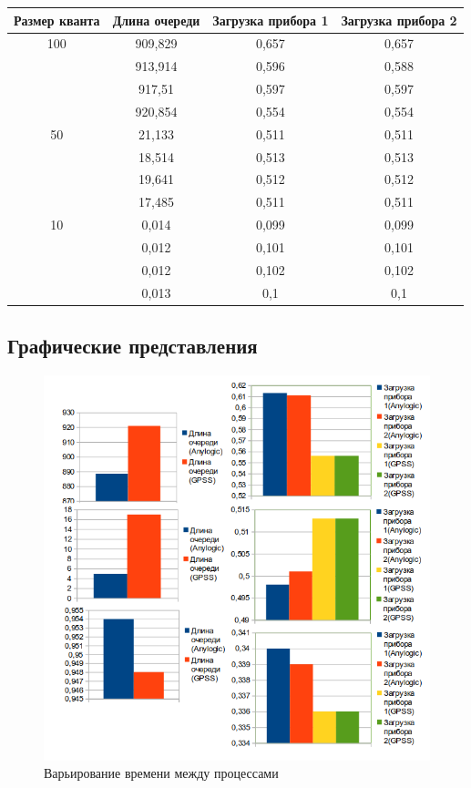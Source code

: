 \begin{tabular}{|c|c|c|c|}
\hline
Размер кванта & Длина очереди & Загрузка прибора 1 & Загрузка прибора 2 \\ \hline
100 & 909,829 & 0,657 & 0,657 \\ \hline
 & 913,914 & 0,596 & 0,588 \\ \hline
 & 917,51 & 0,597 & 0,597 \\ \hline
 & 920,854 & 0,554 & 0,554 \\ \hline
50 & 21,133 & 0,511 & 0,511 \\ \hline
 & 18,514 & 0,513 & 0,513 \\ \hline
 & 19,641 & 0,512 & 0,512 \\ \hline
 & 17,485 & 0,511 & 0,511 \\ \hline
10 & 0,014 & 0,099 & 0,099 \\ \hline
 & 0,012 & 0,101 & 0,101 \\ \hline
 & 0,012 & 0,102 & 0,102 \\ \hline
 & 0,013 & 0,1 & 0,1 \\ \hline
\end{tabular}
\subsection{Графические представления}
\begin{figure}
\centering
\includegraphics[resolution=96]{img/intensity.png}
\caption{Варьирование времени между процессами}
\end{figure}

